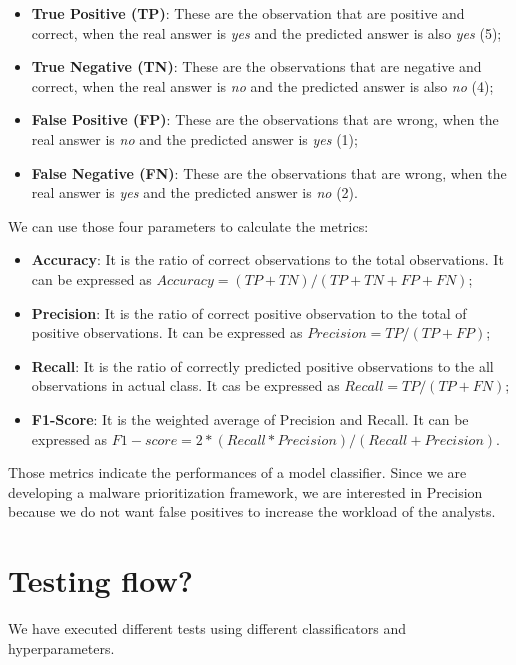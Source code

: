 \begin{itemize}
	\item \textbf{True Positive (TP)}: These are the observation that are positive and correct, when the real answer is \textit{yes} and the predicted answer is also \textit{yes} (5);
	\item \textbf{True Negative (TN)}: These are the observations that are negative and correct, when the real answer is \textit{no} and the predicted answer is also \textit{no} (4);
	\item \textbf{False Positive (FP)}: These are the observations that are wrong, when the real answer is  \textit{no} and the predicted answer is \textit{yes} (1); 
	\item \textbf{False Negative (FN)}: These are the observations that are wrong, when the real answer is  \textit{yes} and the predicted answer is \textit{no} (2).
	
	
\end{itemize} 

We can use those four parameters to calculate the metrics:
\begin{itemize}
	\item \textbf{Accuracy}: It is the ratio of correct observations to the total observations. It can be expressed as $Accuracy = (TP + TN) / (TP + TN + FP + FN)$;
	\item \textbf{Precision}: It is the ratio of correct positive observation to the total of positive observations. It can be expressed as $Precision = TP/(TP + FP)$;
	\item \textbf{Recall}: It is the ratio of  correctly predicted positive observations to the all observations in actual class. It cas be expressed as $Recall = TP/(TP + FN)$;
	\item \textbf{F1-Score}: It is the weighted average of Precision and Recall. It can be expressed as $F1-score = 2 * (Recall * Precision) / (Recall + Precision)$.
\end{itemize}
Those metrics indicate the performances of a model classifier. Since we are developing a malware prioritization framework, we are interested in Precision because we do not want false positives to increase the workload of the analysts. 


\section{Testing flow?}
\label{sec:flow}

We have executed different tests using different classificators and hyperparameters. 

